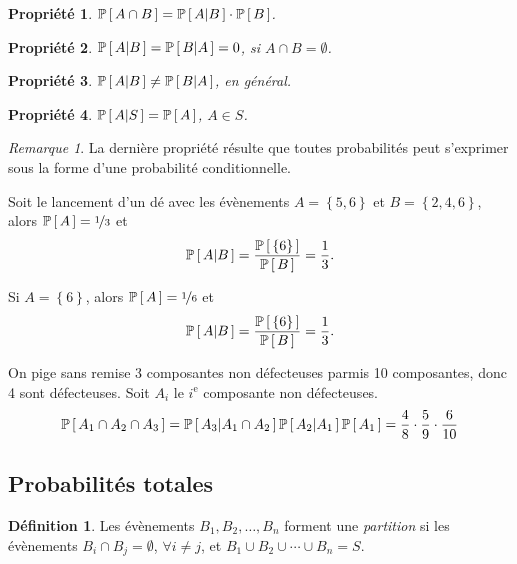 \documentclass[11pt]{article}
\makeatletter
\renewcommand\P[1]{%
	\ensuremath{%
		\mathbb{P}\left[\,#1\,\right]%
	}%
}%
\newcommand\Pg[2]{%
	\ensuremath{%
		\mathbb{P}\left[\,#1\middle\rvert#2\,\right]%
	}%
}%
\newtheorem{property}{Propriété}
\theoremstyle{remark}
\newtheorem*{remark}{Remarque}
\theoremstyle{definition}
\newtheorem*{@definition}{Définition}
\newenvironment{definition}{%
	\begin{@definition}%
}{%
	\end{@definition}%
	\setcounter{property}{0}%
}
\makeatother
\begin{document}
\begin{property}
	$\P{A\cap B}=\Pg{A}{B}\cdot\P{B}$.
\end{property}

\begin{property}
	$\Pg{A}{B}=\Pg{B}{A}=0$, si $A\cap B=\emptyset$.
\end{property}

\begin{property}
	$\Pg{A}{B}\neq\Pg{B}{A}$, en général.
\end{property}

\begin{property}
	$\Pg{A}{S}=\P{A}$, $A\in S$.
\end{property}

\begin{remark}
	La dernière propriété résulte que toutes probabilités peut s'exprimer sous
	la forme d'une probabilité conditionnelle.
\end{remark}

\begin{exemple}
	Soit le lancement d'un dé avec les évènements $A=\left\{5,6\right\}$ et
	$B=\left\{2,4,6\right\}$, alors $\P{A}=\nicefrac{1}{3}$ et 
	\begin{equation*}
		\Pg{A}{B}=\frac{\P{\left\{6\right\}}}{\P{B}}=\frac{1}{3}.
	\end{equation*}

	Si $A=\left\{6\right\}$, alors $\P{A}=\nicefrac{1}{6}$ et
	\begin{equation*}
		\Pg{A}{B}=\frac{\P{\left\{6\right\}}}{\P{B}}=\frac{1}{3}.
	\end{equation*}
\end{exemple}

\begin{exemple}
	On pige sans remise 3 composantes non défecteuses parmis 10 composantes, donc 4 sont
	défecteuses. Soit $A_i$ le $i^\text{e}$ composante non défecteuses.
	\begin{equation*}
		\P{A_1\cap A_2\cap A_3}=\Pg{A_3}{A_1\cap A_2}\Pg{A_2}{A_1}\P{A_1}
		=\frac{4}{8}\cdot\frac{5}{9}\cdot\frac{6}{10}
	\end{equation*}
\end{exemple}

\subsection{Probabilités totales}
\begin{definition}
	Les évènements $B_1,B_2,\dots,B_n$ forment une \textit{partition} si les
	évènements $B_i\cap B_j=\emptyset$, $\forall i\neq j$, et
	$B_1\cup B_2\cup\cdots\cup B_n=S$.
\end{definition}
\end{document}
